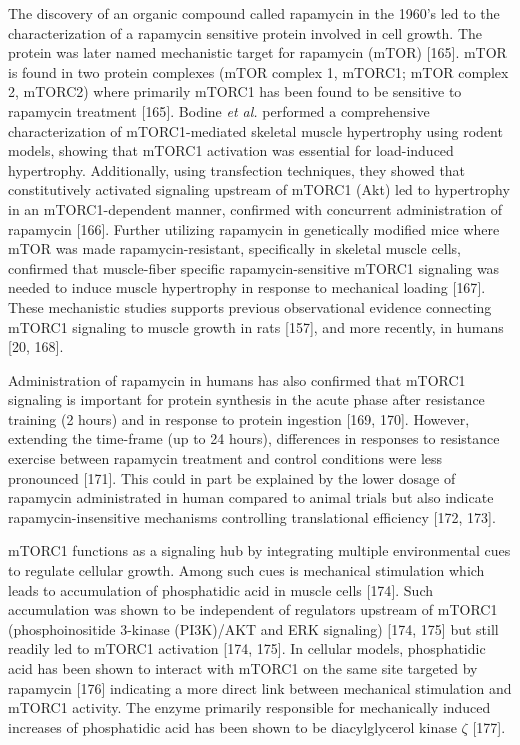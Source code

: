 \documentclass[twoside,10pt]{gihclass} %
\begin{document}
The discovery of an organic compound called rapamycin in the 1960's led to the characterization of a rapamycin sensitive protein involved in cell growth. The protein was later named mechanistic target for rapamycin (mTOR)
{[}165{]}.
mTOR is found in two protein complexes (mTOR complex 1, mTORC1; mTOR complex 2, mTORC2) where primarily mTORC1 has been found to be sensitive to rapamycin treatment
{[}165{]}.
Bodine \emph{et al.} performed a comprehensive characterization of mTORC1-mediated skeletal muscle hypertrophy using rodent models, showing that mTORC1 activation was essential for load-induced hypertrophy. Additionally, using transfection techniques, they showed that constitutively activated signaling upstream of mTORC1 (Akt) led to hypertrophy in an mTORC1-dependent manner, confirmed with concurrent administration of rapamycin
{[}166{]}.
Further utilizing rapamycin in genetically modified mice where mTOR was made rapamycin-resistant, specifically in skeletal muscle cells, confirmed that muscle-fiber specific rapamycin-sensitive mTORC1 signaling was needed to induce muscle hypertrophy in response to mechanical loading
{[}167{]}.
These mechanistic studies supports previous observational evidence connecting mTORC1 signaling to muscle growth in rats
{[}157{]},
and more recently, in humans
{[}20, 168{]}.

Administration of rapamycin in humans has also confirmed that mTORC1 signaling is important for protein synthesis in the acute phase after resistance training (2 hours) and in response to protein ingestion
{[}169, 170{]}.
However, extending the time-frame (up to 24 hours), differences in responses to resistance exercise between rapamycin treatment and control conditions were less pronounced
{[}171{]}.
This could in part be explained by the lower dosage of rapamycin administrated in human compared to animal trials but also indicate rapamycin-insensitive mechanisms controlling translational efficiency
{[}172, 173{]}.

mTORC1 functions as a signaling hub by integrating multiple environmental cues to regulate cellular growth. Among such cues is mechanical stimulation which leads to accumulation of phosphatidic acid in muscle cells
{[}174{]}.
Such accumulation was shown to be independent of regulators upstream of mTORC1 (phosphoinositide 3-kinase (PI3K)/AKT and ERK signaling)
{[}174, 175{]}
but still readily led to mTORC1 activation
{[}174, 175{]}.
In cellular models, phosphatidic acid has been shown to interact with mTORC1 on the same site targeted by rapamycin
{[}176{]}
indicating a more direct link between mechanical stimulation and mTORC1 activity.
The enzyme primarily responsible for mechanically induced increases of phosphatidic acid has been shown to be diacylglycerol kinase \(\zeta\)
{[}177{]}.
\end{document}
